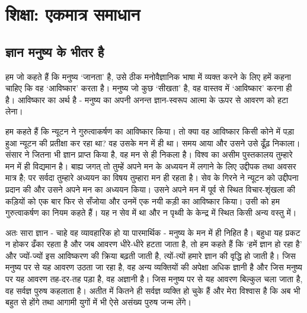 
\chapter{शिक्षा: एकमात्र समाधान }

\indentsecionsintoc



\section*{ज्ञान मनुष्य के भीतर है}

\vskip -5pt

हम जो कहते हैं कि मनुष्य ‘जानता’ है, उसे ठीक मनोवैज्ञानिक भाषा में व्यक्त करने के लिए हमें कहना चाहिए कि वह ‘आविष्कार’ करता है। मनुष्य जो कुछ ‘सीखता’ है, वह वास्तव में ‘आविष्कार’ करना ही है। आविष्कार का अर्थ है - मनुष्य का अपनी अनन्त ज्ञान-स्वरूप आत्मा के ऊपर से आवरण को हटा लेना। 

हम कहते हैं कि न्यूटन ने गुरुत्वाकर्षण का आविष्कार किया। तो क्या वह आविष्कार किसी कोने में पड़ा हुआ न्यूटन की प्रतीक्षा कर रहा था? वह उसके मन में ही था। समय आया और उसने उसे ढूँढ़ निकाला। संसार ने जितना भी ज्ञान प्राप्त किया है, वह मन से ही निकला है। विश्व का असीम पुस्तकालय तुम्हारे मन में ही विद्यमान है। बाह्य जगत् तो तुम्हें अपने मन के अध्ययन में लगाने के लिए उद्दीपक तथा अवसर मात्र है; पर सर्वदा तुम्हारे अध्ययन का विषय तुम्हारा मन ही रहता है। सेव के गिरने ने न्यूटन को उद्दीपना प्रदान की और उसने अपने मन का अध्ययन किया। उसने अपने मन में पूर्व से स्थित विचार-शृंखला की कड़ियों को एक बार फिर से सँजोया और उनमें एक नयी कड़ी का आविष्कार किया। उसी को हम गुरुत्वाकर्षण का नियम कहते हैं। यह न सेव में था और न पृथ्वी के केन्द्र में स्थित किसी अन्य वस्तु में। 

अतः सारा ज्ञान - चाहे वह व्यावहारिक हो या पारमार्थिक - मनुष्य के मन में ही निहित है। बहुधा यह प्रकट न होकर ढँका रहता है और जब आवरण धीरे-धीरे हटता जाता है, तो हम कहते हैं कि ‘हमें ज्ञान हो रहा है’ और ज्यों-ज्यों इस आविष्करण की क्रिया बढ़ती जाती है, त्यों-त्यों हमारे ज्ञान की वृद्धि हो जाती है। जिस मनुष्य पर से यह आवरण उठता जा रहा है, वह अन्य व्यक्तियों की अपेक्षा अधिक ज्ञानी है और जिस मनुष्य पर यह आवरण तह-दर-तह पड़ा है, वह अज्ञानी है। जिस मनुष्य पर से यह आवरण बिल्कुल चला जाता है, वह सर्वज्ञ पुरुष कहलाता है। अतीत में कितने ही सर्वज्ञ व्यक्ति हो चुके हैं और मेरा विश्वास है कि अब भी बहुत से होंगे तथा आगामी युगों में भी ऐसे असंख्य पुरुष जन्म लेंगे।


